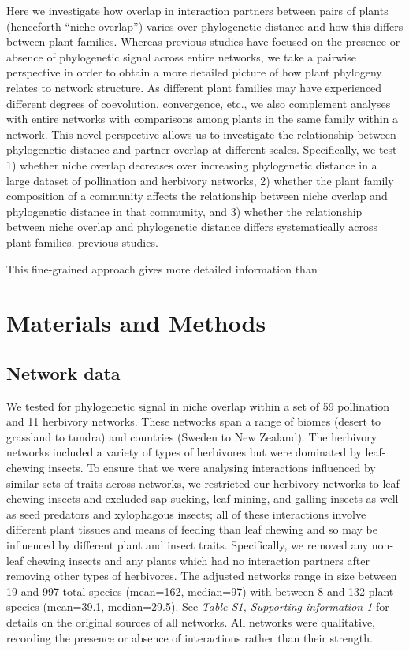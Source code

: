 \documentclass[12pt]{article}
\begin{document}
\begin{spacing}{1.5}
  Here we investigate how overlap in interaction partners between 
  pairs of plants (henceforth ``niche overlap'') varies over 
  phylogenetic distance and how this differs between plant families. 
  Whereas previous 
  studies have focused on the presence or absence of phylogenetic
  signal across entire networks, we take a pairwise perspective in
  order to obtain a more detailed picture of how plant phylogeny
  relates to network structure. As different plant families may have experienced different degrees of coevolution, convergence, etc., we also complement analyses with entire networks with comparisons among plants in the same family within a network. 
  This novel perspective allows us to investigate the relationship between phylogenetic distance and partner overlap at different scales. 
  Specifically,
  we test 1) whether niche overlap decreases over increasing phylogenetic
  distance in a large dataset of pollination and herbivory networks, 
  2) whether the plant family composition of a community affects the
  relationship between niche overlap and phylogenetic distance in that 
  community, and 3) whether the relationship between niche overlap and 
  phylogenetic distance differs systematically across plant families. 
  previous studies. 

  This fine-grained approach gives more detailed information than 

\section*{Materials and Methods}

  \subsection*{Network data}

    We tested for phylogenetic signal in niche overlap within a 
    set of 59 pollination and 11 herbivory networks. These networks span 
    a range of biomes (desert to grassland to tundra) and 
    countries (Sweden to New Zealand). The herbivory networks included a 
    variety of types of herbivores but were dominated by leaf-chewing insects. To ensure that we were analysing interactions 
    influenced by similar sets of traits across networks, we restricted 
    our herbivory networks to leaf-chewing insects and excluded 
    sap-sucking, leaf-mining, and galling insects as well as seed 
    predators and xylophagous insects; all of these interactions involve 
    different plant tissues and means of feeding than leaf chewing 
    and so may be influenced by different plant and insect traits. 
    Specifically, we removed any non-leaf chewing insects and any 
    plants which had no interaction partners after removing other types  
    of herbivores. The adjusted networks range in size between 19 and 
    997 total species (mean=162, median=97) with between 8 and 132 
    plant species (mean=39.1, median=29.5). See \emph{Table S1, 
    Supporting information 1} for details on the original sources of all 
    networks. All networks were qualitative, recording the presence or 
    absence of interactions rather than their strength.



\end{spacing}
\end{document}
